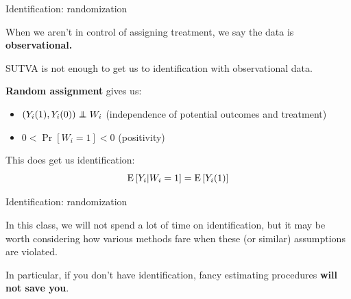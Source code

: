 \documentclass[xcolor={dvipsnames}, handout]{beamer}
\begin{document}

\begin{frame}{Identification: randomization}

\begin{wideitemize}
\item When we aren't in control of assigning treatment, we say the data is \textbf{observational.}\pause
\item SUTVA is not enough to get us to identification with observational data. \pause
\item \textbf{Random assignment} gives us:  \pause
\begin{itemize}
\item $(Y_i(1), Y_i(0)) \independent W_i$ (independence of potential outcomes and treatment)
\item $0< \Pr[W_i = 1] <0$ (positivity)\pause
\end{itemize}
\item This does get us identification:
\[
{\textrm E}\,[Y_i | W_i = 1] = {\textrm E}\,[Y_i(1)]
\]
\end{wideitemize}

\end{frame}



\begin{frame}{Identification: randomization}

\begin{wideitemize}
\item In this class, we will not spend a lot of time on identification, but it may be worth considering how various methods fare when these (or similar) assumptions are violated. \pause
\item In particular, if you don't have identification, fancy estimating procedures \textbf{will not save you}. 
\end{wideitemize}

\end{frame}
\end{document}

